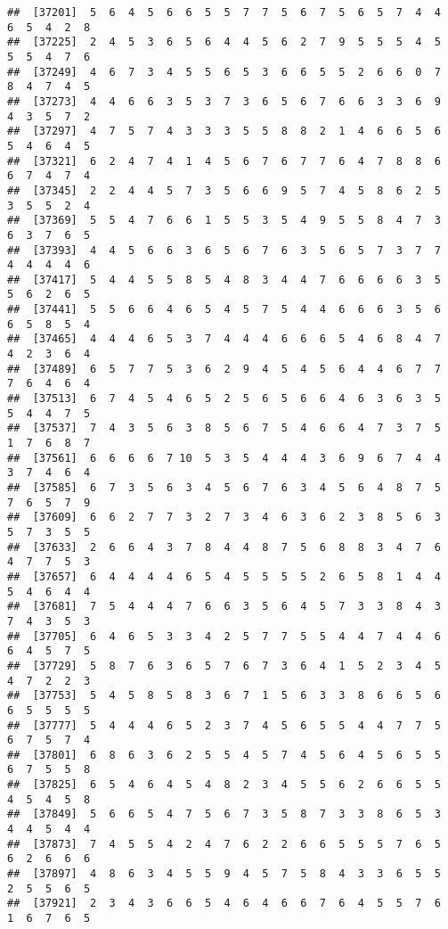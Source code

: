 \documentclass[
]{book}
\begin{document}
\begin{verbatim}
##  [37201]  5  6  4  5  6  6  5  5  7  7  5  6  7  5  6  5  7  4  4  6  5  4  2  8
##  [37225]  2  4  5  3  6  5  6  4  4  5  6  2  7  9  5  5  5  4  5  5  5  4  7  6
##  [37249]  4  6  7  3  4  5  5  6  5  3  6  6  5  5  2  6  6  0  7  8  4  7  4  5
##  [37273]  4  4  6  6  3  5  3  7  3  6  5  6  7  6  6  3  3  6  9  4  3  5  7  2
##  [37297]  4  7  5  7  4  3  3  3  5  5  8  8  2  1  4  6  6  5  6  5  4  6  4  5
##  [37321]  6  2  4  7  4  1  4  5  6  7  6  7  7  6  4  7  8  8  6  6  7  4  7  4
##  [37345]  2  2  4  4  5  7  3  5  6  6  9  5  7  4  5  8  6  2  5  3  5  5  2  4
##  [37369]  5  5  4  7  6  6  1  5  5  3  5  4  9  5  5  8  4  7  3  6  3  7  6  5
##  [37393]  4  4  5  6  6  3  6  5  6  7  6  3  5  6  5  7  3  7  7  4  4  4  4  6
##  [37417]  5  4  4  5  5  8  5  4  8  3  4  4  7  6  6  6  6  3  5  5  6  2  6  5
##  [37441]  5  5  6  6  4  6  5  4  5  7  5  4  4  6  6  6  3  5  6  6  5  8  5  4
##  [37465]  4  4  4  6  5  3  7  4  4  4  6  6  6  5  4  6  8  4  7  4  2  3  6  4
##  [37489]  6  5  7  7  5  3  6  2  9  4  5  4  5  6  4  4  6  7  7  7  6  4  6  4
##  [37513]  6  7  4  5  4  6  5  2  5  6  5  6  6  4  6  3  6  3  5  5  4  4  7  5
##  [37537]  7  4  3  5  6  3  8  5  6  7  5  4  6  6  4  7  3  7  5  1  7  6  8  7
##  [37561]  6  6  6  6  7 10  5  3  5  4  4  4  3  6  9  6  7  4  4  3  7  4  6  4
##  [37585]  6  7  3  5  6  3  4  5  6  7  6  3  4  5  6  4  8  7  5  7  6  5  7  9
##  [37609]  6  6  2  7  7  3  2  7  3  4  6  3  6  2  3  8  5  6  3  5  7  3  5  5
##  [37633]  2  6  6  4  3  7  8  4  4  8  7  5  6  8  8  3  4  7  6  4  7  7  5  3
##  [37657]  6  4  4  4  4  6  5  4  5  5  5  5  2  6  5  8  1  4  4  5  4  6  4  4
##  [37681]  7  5  4  4  4  7  6  6  3  5  6  4  5  7  3  3  8  4  3  7  4  3  5  3
##  [37705]  6  4  6  5  3  3  4  2  5  7  7  5  5  4  4  7  4  4  6  6  4  5  7  5
##  [37729]  5  8  7  6  3  6  5  7  6  7  3  6  4  1  5  2  3  4  5  4  7  2  2  3
##  [37753]  5  4  5  8  5  8  3  6  7  1  5  6  3  3  8  6  6  5  6  6  5  5  5  5
##  [37777]  5  4  4  4  6  5  2  3  7  4  5  6  5  5  4  4  7  7  5  6  7  5  7  4
##  [37801]  6  8  6  3  6  2  5  5  4  5  7  4  5  6  4  5  6  5  5  6  7  5  5  8
##  [37825]  6  5  4  6  4  5  4  8  2  3  4  5  5  6  2  6  6  5  5  4  5  4  5  8
##  [37849]  5  6  6  5  4  7  5  6  7  3  5  8  7  3  3  8  6  5  3  4  4  5  4  4
##  [37873]  7  4  5  5  4  2  4  7  6  2  2  6  6  5  5  5  7  6  5  6  2  6  6  6
##  [37897]  4  8  6  3  4  5  5  9  4  5  7  5  8  4  3  3  6  5  5  2  5  5  6  5
##  [37921]  2  3  4  3  6  6  5  4  6  4  6  6  7  6  4  5  5  7  6  1  6  7  6  5

\end{verbatim}
\end{document}
